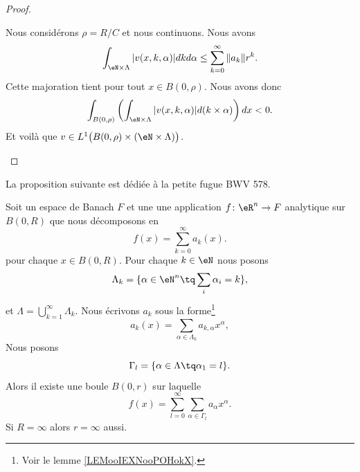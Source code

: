 \begin{proof}
\begin{subproof}
		\spitem[La fonction \( v\)]
		Nous considérons \( \rho=R/C\) et nous continuons. Nous avons
		\begin{equation}
			\int_{\eN\times \Lambda}| v(x,k,\alpha) |dkd\alpha\leq \sum_{k=0}^{\infty}\| a_k \|r^k.
		\end{equation}
		Cette majoration tient pour tout \( x\in B(0,\rho)\). Nous avons donc
		\begin{equation}
			\int_{B(0,\rho)}\left( \int_{\eN\times \Lambda}| v(x,k,\alpha) |d(k\times \alpha) \right)dx<0.
		\end{equation}
		Et voilà que \( v\in L^1\big( B(0,\rho)\times (\eN\times \Lambda) \big)\).
	\end{subproof}
\end{proof}


La proposition suivante est dédiée à la petite fugue BWV 578.

\begin{proposition}	\label{PROPooZMXDooHLRvCd}
	Soit un espace de Banach \( F\) et une une application \(f \colon \eR^n\to F  \) analytique sur \( B(0,R)\) que nous décomposons en
	\begin{equation}
		f(x)=\sum_{k=0}^{\infty}a_k(x).
	\end{equation}
	pour chaque \( x\in B(0,R)\). Pour chaque \( k\in \eN\) nous posons
	\begin{equation}
		\Lambda_k=\{ \alpha\in \eN^n\tq \sum_i\alpha_i=k \},
	\end{equation}
	et \( \Lambda=\bigcup_{k=1}^{\infty}\Lambda_k\). Nous écrivons \( a_k\) sous la forme\footnote{Voir le lemme \ref{LEMooIEXNooPOHokX}.}
	\begin{equation}
		a_k(x)=\sum_{\alpha\in\Lambda_k}a_{k,\alpha}x^{\alpha},
	\end{equation}
	Nous posons
	\begin{equation}
		\Gamma_l=\{ \alpha\in\Lambda\tq \alpha_1=l \}.
	\end{equation}
	Alors il existe une boule \( B(0,r)\) sur laquelle
	\begin{equation}
		f(x)=\sum_{l=0}^{\infty}\sum_{\alpha\in\Gamma_l}a_{\alpha}x^{\alpha}.
	\end{equation}
	Si \( R=\infty\) alors \( r=\infty\) aussi.
\end{proposition}

